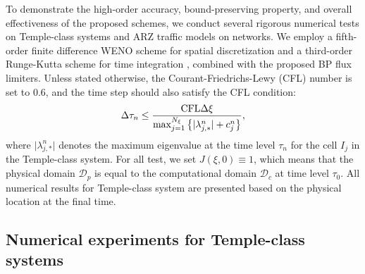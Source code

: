 \documentclass[times,final,11pt]{elsarticle}
\numberwithin{equation}{section}
\theoremstyle{definition}
\theoremstyle{remark}
\begin{document}
To demonstrate the high-order accuracy, bound-preserving property, and overall effectiveness of the proposed schemes, we conduct several rigorous numerical tests on Temple-class systems and ARZ traffic models on networks. We employ a fifth-order finite difference WENO scheme for spatial discretization \cite{shu1998essentially,jiang1996efficient} and a third-order Runge-Kutta scheme for time integration \cite{gottlieb2001strong}, combined with the proposed BP flux limiters. Unless stated otherwise, the Courant-Friedrichs-Lewy (CFL) number is set to $0.6$, and the time step should also satisfy the CFL condition:
\begin{equation*}
	\Delta \tau_n \leq \frac{{\rm CFL} \Delta \xi}{\max_{j = 1}^{N_\xi} \left\{ \vert \lambda_{j, *}^n \vert + c_j^n\right\}},
\end{equation*}
where $\vert \lambda_{j, *}^n \vert$ denotes the maximum eigenvalue at the time level $\tau_n$ for the cell $I_j$ in the Temple-class system.
For all test, we set $J(\xi, 0) \equiv 1$, which means that the physical domain $\mathcal{D}_p$ is equal to the computational domain $\mathcal{D}_c$ at time level $\tau_0$. All numerical results for Temple-class system are presented based on the physical location at the final time.

\subsection{Numerical experiments for Temple-class systems}\label{sec:single}
\end{document}
